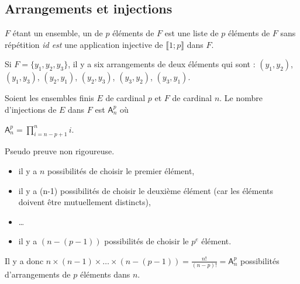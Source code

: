 \subsection{Arrangements et injections}
\begin{definition}
\(𝐹\) étant un ensemble, un  de \(𝑝\) éléments de \(𝐹\) est une liste de \(𝑝\)
éléments de \(𝐹\) sans répétition \emph{id est} une application injective de \(⟦1;𝑝⟧\) dans \(𝐹\).
\end{definition}
\begin{example}
Si \(𝐹=\{𝑦_1,𝑦_2,𝑦_3\}\), il y a six arrangements de deux éléments qui sont : \((𝑦_1,𝑦_2)\), \((𝑦_1,𝑦_3)\),
\((𝑦_2,𝑦_1)\), \((𝑦_2,𝑦_3)\), \((𝑦_3,𝑦_2)\), \((𝑦_3,𝑦_1)\).
\end{example}
\begin{theorem}
Soient les ensembles finis \(𝐸\) de cardinal \(𝑝\) et \(𝐹\) de cardinal \(𝑛\). Le nombre d'injections de \(𝐸\) dans
\(𝐹\) est \(𝖠^𝑝_𝑛\) où

\(𝖠^𝑝_𝑛=\prod _{𝑖=𝑛-𝑝+1}^{𝑛}𝑖\).
\end{theorem}
\begin{remark}
 Pseudo preuve non rigoureuse.
\begin{itemize}
\item
il y a \(𝑛\) possibilités de choisir le premier élément,
\item
il y a (n-1) possibilités de choisir le deuxième élément (car les éléments doivent être mutuellement distincts),
\item
…
\item
il y a \((𝑛-(𝑝-1))\) possibilités de choisir le \(𝑝^{𝑒}\) élément.
\end{itemize}
Il y a donc \(𝑛\times (𝑛-1)\times …\times (𝑛-(𝑝-1))=\frac{𝑛!}{(𝑛-𝑝)!}=𝖠^𝑝_𝑛\) possibilités d’arrangements
de \(𝑝\) éléments dans \(𝑛\).
\end{remark}
